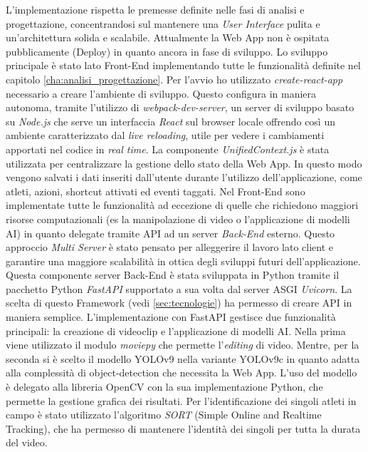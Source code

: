 L'implementazione rispetta le premesse definite nelle fasi di analisi e progettazione, concentrandosi sul mantenere una \textit{User Interface} pulita e un'architettura solida e scalabile.
Attualmente la Web App non è ospitata pubblicamente (Deploy) in quanto ancora in fase di sviluppo.
Lo sviluppo principale è stato lato Front-End implementando tutte le funzionalità definite nel capitolo \ref{cha:analisi_progettazione}. Per l'avvio ho utilizzato \textit{create-react-app} necessario a creare l'ambiente di sviluppo. Questo configura in maniera autonoma, tramite l'utilizzo di  \textit{webpack-dev-server}, un server di sviluppo basato su \textit{Node.js} che serve un interfaccia \textit{React} sul browser locale offrendo così un ambiente caratterizzato dal \textit{live reloading}, utile per vedere i cambiamenti apportati nel codice in \textit{real time}. 
La componente \textit{UnifiedContext.js} è stata utilizzata per centralizzare la gestione dello stato della Web App. In questo modo vengono salvati i dati inseriti dall'utente durante l'utilizzo dell'applicazione, come atleti, azioni, shortcut attivati ed eventi taggati. 
Nel Front-End sono implementate tutte le funzionalità ad eccezione di quelle che richiedono maggiori risorse computazionali (es la manipolazione di video o l'applicazione di modelli AI) in quanto delegate tramite API ad un server \textit{Back-End} esterno.
Questo approccio \textit{Multi Server} è stato pensato per alleggerire il lavoro lato client e garantire una maggiore scalabilità in ottica degli sviluppi futuri dell'applicazione.
Questa componente server Back-End è stata sviluppata in Python tramite il pacchetto Python \textit{FastAPI} supportato a sua volta dal server ASGI \textit{Uvicorn}. La scelta di questo Framework (vedi \ref{sec:tecnologie}) ha permesso di creare API in maniera semplice.
L'implementazione con FastAPI gestisce due funzionalità principali: la creazione di videoclip e l'applicazione di modelli AI. Nella prima viene utilizzato il modulo \textit{moviepy} che permette l'\textit{editing} di video. Mentre, per la seconda si è scelto il modello YOLOv9 nella variante YOLOv9c in quanto adatta alla complessità di object-detection che necessita la Web App. L'uso del modello è delegato alla libreria OpenCV con la sua implementazione Python, che permette la gestione grafica dei risultati. Per l'identificazione dei singoli atleti in campo è stato utilizzato l'algoritmo \textit{SORT} (Simple Online and Realtime Tracking), che ha permesso di mantenere l'identità dei singoli per tutta la durata del video.  

